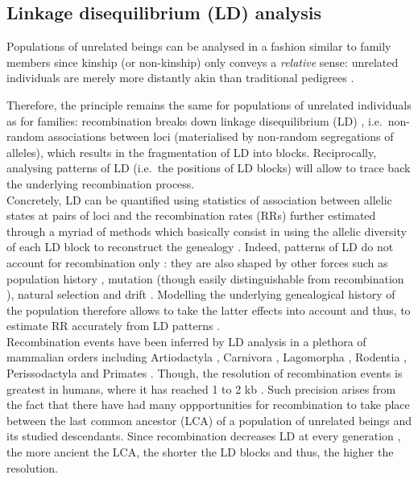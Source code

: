 \subsection{Linkage disequilibrium (LD) analysis}%
\label{chap3:LD}

Populations of unrelated beings can be analysed in a fashion similar to family members since kinship (or non-kinship) only conveys a \textit{relative} sense: unrelated individuals are merely more distantly akin than traditional pedigrees \citep{nordborg2002linkage}.

Therefore, the principle remains the same for populations of unrelated individuals as for families: recombination breaks down linkage disequilibrium (LD) \citep{lewontin1960evolutionary}, i.e.\ non-random associations between loci (materialised by non-random segregations of alleles), which results in the fragmentation of LD into blocks.
Reciprocally, analysing patterns of LD (i.e.\ the positions of LD blocks) will allow to trace back the underlying recombination process.\\

Concretely, LD can be quantified using statistics of association between allelic states at pairs of loci \citep{lewontin1964interaction,hill1968linkage} and the recombination rates (RRs) further estimated through a myriad of methods \citep[reviewed in][]{stumpf2003estimating} which basically consist in using the allelic diversity of each LD block to reconstruct the genealogy \citep[reviewed in][]{hinch2013landscape}.
Indeed, patterns of LD do not account for recombination only \citep[reviewed in][]{venn2013inferring}: they are also shaped by other forces such as population history \citep{golding1984sampling}, mutation \citep{calafell2001haplotype} (though easily distinguishable from recombination \citep{hudson1985statistical}), natural selection \citep{barton2000genetic} and drift \citep{charlesworth1997effects}. 
Modelling the underlying genealogical history of the population therefore allows to take the latter effects into account and thus, to estimate RR accurately from LD patterns \citep{stumpf2003estimating}.\\

Recombination events have been inferred by LD analysis in a plethora of mammalian orders including Artiodactyla \citep{farnir2000extensive,mcrae2002linkage,nsengimana2004linkage}, Carnivora \citep{menotti-raymond1999genetic,sutter2004extensive,verardi2006detecting}, Lagomorpha \citep{carneiro2011genetic}, Rodentia \citep{brunschwig2012finescale}, Perissodactyla \citep{corbin2010linkage, mccue2012high} and Primates \citep{auton2012finescale}.
Though, the resolution of recombination events is greatest in humans, where it has reached 1 to 2 kb \citep{theinternationalhapmapconsortium2007seconda, hinch2011landscape, the1000genomesprojectconsortium2015global}.
Such precision arises from the fact that there have had many oppportunities for recombination to take place between the last common ancestor (LCA) of a population of unrelated beings and its studied descendants.
Since recombination decreases LD at every generation \citep{slatkin2008linkage}, the more ancient the LCA, the shorter the LD blocks and thus, the higher the resolution.

